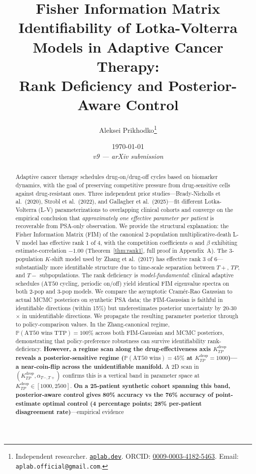 \documentclass[11pt]{article}
\title{Fisher Information Matrix Identifiability of Lotka-Volterra Models in
Adaptive Cancer Therapy: \\ Rank Deficiency and Posterior-Aware Control}
\author{Aleksei Prikhodko\thanks{Independent researcher. \href{https://www.aplab.dev/}{\texttt{aplab.dev}}. ORCID: \href{https://orcid.org/0009-0003-4182-5463}{0009-0003-4182-5463}. Email: \texttt{aplab.official@gmail.com}.}}
\date{\today \\ \textit{v9 — arXiv submission}}
\newcommand{\Prob}{\mathbb{P}}
\newcommand{\TTP}{\mathrm{TTP}}
\newcommand{\AT}{\mathrm{AT}}
\newcommand{\Kdrop}{K_{TP}^{\text{drop}}}
\newcommand{\Tplus}{T{+}}
\newcommand{\Tminus}{T{-}}
\begin{document}
\maketitle

\begin{abstract}
Adaptive cancer therapy schedules drug-on/drug-off cycles based on biomarker
dynamics, with the goal of preserving competitive pressure from drug-sensitive
cells against drug-resistant ones. Three independent prior studies---Brady-Nicholls
et al.\ (2020), Strobl et al.\ (2022), and Gallagher et al.\ (2025)---fit different
Lotka-Volterra (L-V) parameterizations to overlapping clinical cohorts and
converge on the empirical conclusion that \emph{approximately one effective
parameter per patient} is recoverable from PSA-only observation. We provide the
structural explanation: the Fisher Information Matrix (FIM) of the canonical
2-population multiplicative-death L-V model has effective rank 1 of 4, with the
competition coefficients $\alpha$ and $\beta$ exhibiting estimate-correlation
$-1.00$ (Theorem~\ref{thm:rank1}, full proof in Appendix~A). The 3-population
$K$-shift model used by Zhang et al.\ (2017) has effective rank 3 of
6---substantially more identifiable structure due to time-scale separation
between $\Tplus$, $TP$, and $\Tminus$ subpopulations. The rank deficiency is
\emph{model-fundamental}: clinical adaptive schedules ($\AT 50$ cycling, periodic
on/off) yield identical FIM eigenvalue spectra on both 2-pop and 3-pop models. We
compare the asymptotic Cram\'er-Rao Gaussian to actual MCMC posteriors on
synthetic PSA data; the FIM-Gaussian is faithful in identifiable directions
(within 15\%) but underestimates posterior uncertainty by 20-30$\times$ in
unidentifiable directions. We propagate the resulting parameter posterior through
to policy-comparison values. In the Zhang-canonical regime,
$\Prob(\AT 50 \text{ wins } \TTP) = 100\%$ across both FIM-Gaussian and MCMC
posteriors, demonstrating that policy-preference robustness can survive
identifiability rank-deficiency. \textbf{However, a regime scan along the
drug-effectiveness axis $\Kdrop$ reveals a posterior-sensitive regime
($\Prob(\AT 50 \text{ wins}) = 45\%$ at $\Kdrop = 1000$)---a near-coin-flip
across the unidentifiable manifold.} A 2D scan in $(\Kdrop, \alpha_{\Tminus,\Tplus})$
confirms this is a vertical band in parameter space at $\Kdrop \in [1000, 2500]$.
\textbf{On a 25-patient synthetic cohort spanning this band, posterior-aware
control gives 80\% accuracy vs the 76\% accuracy of point-estimate optimal control
(4 percentage points; 28\% per-patient disagreement rate)}---empirical evidence

\end{abstract}
\end{document}
